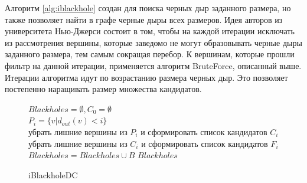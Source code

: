 \documentclass[12pt,a4paper,oneside,openany]{article}
\theoremstyle{definition}
\theoremstyle{lemma}
\theoremstyle{remark}
\begin{document}
\linespread{1.5}

Алгоритм \ref{alg:iblackhole} создан для поиска черных дыр заданного размера, но также позволяет найти в графе черные дыры всех размеров.
Идея авторов из университета Нью-Джерси состоит в том, чтобы на каждой итерации исключать из рассмотрения вершины, которые заведомо не могут
образовывать черные дыры заданного размера, тем самым сокращая перебор.
К вершинам, которые прошли фильтр на данной итерации, применяется алгоритм BruteForce, описанный выше.
Итерации алгоритма идут по возрастанию размера черных дыр. Это позволяет постепенно наращивать размер множества кандидатов.

\linespread{1.0}
\begin{figure}[H]
	\begin{center}
		\begin{algorithm}[H]
			\SetAlgoLined

                        $Blackholes = \emptyset, C_0 = \emptyset$ \\
                         {
                            $P_i = \{v | d_{out}(v) < i\}$ \\
                            убрать лишние вершины из $P_i$ и сформировать список кандидатов $C_i$ \\
                            убрать лишние вершины из $C_i$ и сформировать список кандидатов $F_i$ \\
                             {
                                 {
                                     {
                                         {
                                            $Blackholes = Blackholes \cup B$
                                        }
                                    }
                                }
                            }
                        }
                        \Return $Blackholes$
			\label{alg:iblackholedc}
			\caption{iBlackholeDC}
		\end{algorithm}
	\end{center}
\end{figure}
\linespread{1.5}
\end{document}
